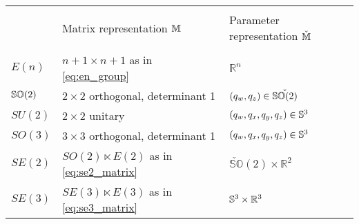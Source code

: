 \begin{tabular}{lll}
  \toprule                                                                                                    \\
           & Matrix representation $\mathbb{M}$                       & Parameter representation $\check{\mathbb{M}}$                \\
  \midrule                                                                                                    \\
  $E(n)$   & $n+1 \times n+1$ as in \eqref{eq:en_group}       & $\mathbb{R}^n$                                \\
  ${\mathbb{SO}(2)}$ & $2 \times 2$ orthogonal, determinant 1           & $(q_w, q_z) \in \check {{\mathbb{SO}(2)}}$              \\
  $SU(2)$  & $2 \times 2$ unitary                             & $(q_w, q_x, q_y, q_z) \in {\mathbb{S}^3}$            \\
  $SO(3)$  & $3 \times 3$ orthogonal, determinant 1           & $(q_w, q_x, q_y, q_z) \in {\mathbb{S}^3}$            \\
  $SE(2)$  & $SO(2) \ltimes E(2)$ as in \eqref{eq:se2_matrix} & $\check {\mathbb{SO}}(2) \times \mathbb{R}^2$ \\
  $SE(3)$  & $SE(3) \ltimes E(3)$ as in \eqref{eq:se3_matrix} & ${\mathbb{S}^3} \times \mathbb{R}^3$                 \\
  \bottomrule
\end{tabular}
